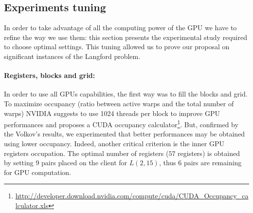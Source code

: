 
\subsection{Experiments tuning}

In order to take advantage of all the computing power of the GPU we have to refine the way we use them: this section presents the experimental study required to choose optimal settings. This tuning allowed us to prove our proposal on significant instances of the Langford problem.

\paragraph{Registers, blocks and grid: }

In order to use all GPUs capabilities, the first way was to fill the blocks and grid. To maximize occupancy (ratio between active warps and the total number of warps) NVIDIA suggests to use 1024 threads per block to improve GPU performances and proposes a CUDA occupancy calculator\footnote{\url{http://developer.download.nvidia.com/compute/cuda/CUDA_Occupancy_calculator.xls}}. But, confirmed by the Volkov's results\cite{Volkov}, we experimented that better performances may be obtained using lower occupancy. Indeed, another critical criterion is the inner GPU registers occupation. 
The optimal number of registers ($57$ registers) is obtained by setting 9 pairs placed on the client for $L(2,15)$, thus 6 pairs are remaining for GPU computation.

